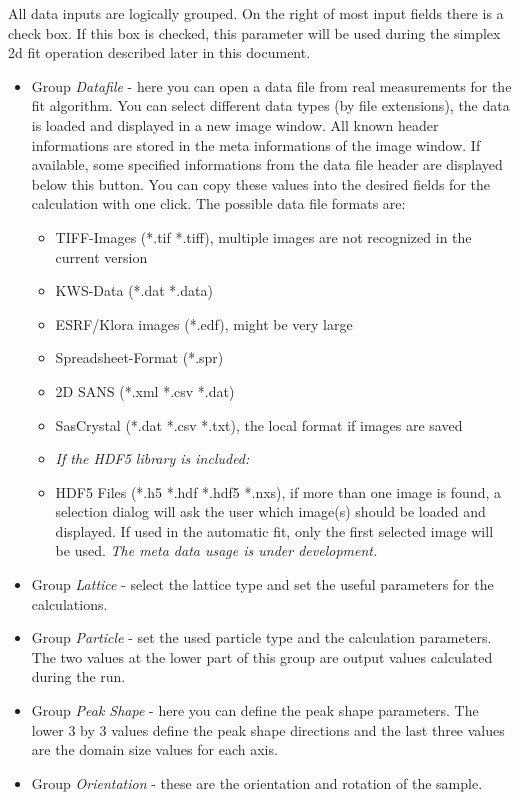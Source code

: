 \documentclass[11pt]{article} %
\begin{document}
All data inputs are logically grouped. On the right of most input fields there is a check box. If this box is checked, this parameter will be used during the simplex 2d fit operation described later in this document.
\begin{itemize}\itemsep0pt
\item Group {\it Datafile} - here you can open a data file from real measurements for the fit algorithm. You can select different data types (by file extensions), the data is loaded and displayed in a new image window. All known header informations are stored in the meta informations of the image window. If available, some specified informations from the data file header are displayed below this button. You can copy these values into the desired fields for the calculation with one click. The possible data file formats are:
	\begin{itemize}\itemsep0pt
	\item TIFF-Images (*.tif *.tiff), multiple images are not recognized in the current version
	\item KWS-Data (*.dat *.data)
	\item ESRF/Klora images (*.edf), might be very large
	\item Spreadsheet-Format (*.spr)
	\item 2D SANS (*.xml *.csv *.dat)
	\item SasCrystal (*.dat *.csv *.txt), the local format if images are saved
	\item[] {\it If the HDF5 library is included:}
	\item HDF5 Files (*.h5 *.hdf *.hdf5 *.nxs), if more than one image is found, a selection dialog will ask the user which image(s) should be loaded and displayed. If used in the automatic fit, only the first selected image will be used. {\it The meta data usage is under development.}
	\end{itemize}
\item Group {\it Lattice} - select the lattice type and set the useful parameters for the calculations.
\item Group {\it Particle} - set the used particle type and the calculation parameters. The two values at the lower part of this group are output values calculated during the run.
\item Group {\it Peak Shape} - here you can define the peak shape parameters. The lower 3 by 3 values define the peak shape directions and the last three values are the domain size values for each axis.
\item Group {\it Orientation} - these are the orientation and rotation of the sample.

\end{itemize}
\end{document}
